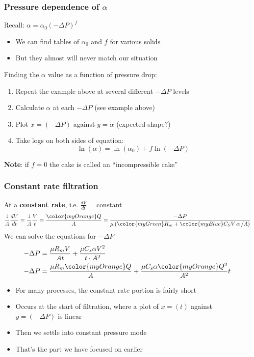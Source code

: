\begin{frame}\frametitle{Pressure dependence of $\alpha$}
	Recall: $\alpha = \alpha_\text{0} \left(-\Delta P\right)^f$
	\begin{itemize}
		\item	We can find tables of $\alpha_\text{0}$ and $f$ for various solids
		\item	But they almost will never match our situation
	\end{itemize}
	
	
	\vspace{12pt}
	Finding the $\alpha$ value as a function of pressure drop:
	\begin{enumerate}
		\item	Repeat the example above at several different $-\Delta P$ levels
		\item	Calculate $\alpha$ at each $-\Delta P$ \hfill {\color{myOrange}(see example above)}
		\item	Plot $x=(-\Delta P)$ against $y = \alpha$ \hfill {\color{myOrange}(expected shape?)}
		\item	Take logs on both sides of equation:
		\[
			\ln{\left(\alpha\right)} = \ln{\left(\alpha_\text{0}\right)} + f \ln{\left(-\Delta P\right)}
		\]
	\end{enumerate}
	\textbf{Note}: if $f=0$ the cake is called an ``{\color{purple}incompressible cake}''
\end{frame}

\begin{frame}\frametitle{Constant rate filtration}
	At a \textbf{constant rate}, i.e. $\frac{dV}{dt}$ = constant
	\[ \dfrac{1}{A} \dfrac{dV}{dt} = \dfrac{1}{A} \dfrac{V}{t} = \dfrac{{\color{myOrange}Q}}{A} = \dfrac{-\Delta P}{\mu \left({\color{myGreen}R_m} + {\color{myBlue}C_S V  \, \mathbf{ \alpha}\, / A} \right)}	\]
	We can solve the equations for $-\Delta P$
	\begin{align*}
		-\Delta P &= \dfrac{\mu R_m V}{A t} + \dfrac{\mu C_s \alpha V^2}{t \cdot A^2}\\
		-\Delta P &= \dfrac{\mu R_m {\color{myOrange}Q}}{A} + \dfrac{\mu C_s \alpha {\color{myOrange}Q^2}}{A^2}t
	\end{align*}
	\begin{itemize}
		\item	For many processes, the constant rate portion is fairly short
		\item	Occurs at the start of filtration, where a plot of $x = (t)$ against $y = (-\Delta P)$ is linear
		\item	Then we settle into constant pressure mode
		\item	That's the part we have focused on earlier
	\end{itemize}
\end{frame}

